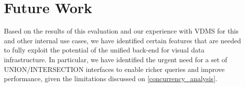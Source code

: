 \section{Future Work}

Based on the results of this evaluation and our experience with VDMS
for this and other internal use cases, we have identified certain features
that are needed to fully exploit the potential of the unified back-end
for visual data infrastructure.
In particular, we have identified the urgent need for a set of UNION/INTERSECTION
interfaces to enable richer queries and improve performance,
given the limitations discussed on \ref{concurrency_analysis}.
